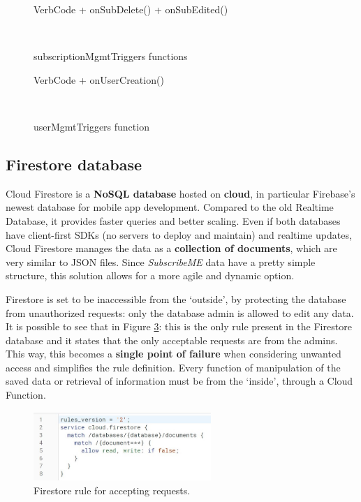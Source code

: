 \documentclass[12pt]{article}
\begin{document}
\begin{figure}[h!]
    \centering
    \begin{SaveVerbatim}{VerbCode}
        + onSubDelete()
        + onSubEdited()
    \end{SaveVerbatim}
    \setlength{\fboxsep}{5mm}
    \caption{subscriptionMgmtTriggers functions}~\label{fig:subtrigger}
\end{figure}

\begin{figure}[h!]
    \centering
    \begin{SaveVerbatim}{VerbCode}
        + onUserCreation()
    \end{SaveVerbatim}
    \setlength{\fboxsep}{5mm}
    \caption{userMgmtTriggers function}~\label{fig:usertrigger}
\end{figure}


\subsection{Firestore database}
Cloud Firestore is a \textbf{NoSQL database} hosted on \textbf{cloud}, in particular Firebase's newest database for mobile app development. Compared to the old Realtime Database, it provides faster queries and better scaling. Even if both databases have client-first SDKs (no servers to deploy and maintain) and realtime updates, Cloud Firestore manages the data as a \textbf{collection of documents}, which are very similar to JSON files. Since \textit{SubscribeME} data have a pretty simple structure, this solution allows for a more agile and dynamic option.

Firestore is set to be inaccessible from the `outside', by protecting the database from unauthorized requests: only the database admin is allowed to edit any data. It is possible to see that in Figure \ref{fig:rule}: this is the only rule present in the Firestore database and it states that the only acceptable requests are from the admins. This way, this becomes a \textbf{single point of failure} when considering unwanted access and simplifies the rule definition. Every function of manipulation of the saved data or retrieval of information must be from the `inside', through a Cloud Function.

\begin{figure}[h!]
    \begin{center}
        \includegraphics[width=0.6\textwidth, clip]{../../assets/firestoreRule.jpg}
    \end{center}
    \caption{Firestore rule for accepting requests.}
    \label{fig:rule}
\end{figure}
\end{document}
